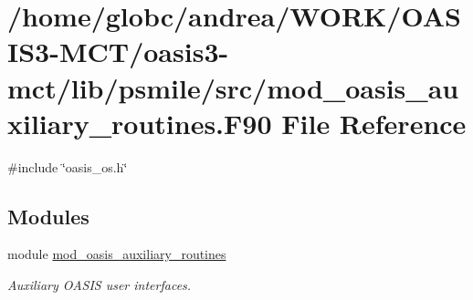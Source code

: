 \hypertarget{mod__oasis__auxiliary__routines_8_f90}{}\section{/home/globc/andrea/\+W\+O\+R\+K/\+O\+A\+S\+I\+S3-\/\+M\+C\+T/oasis3-\/mct/lib/psmile/src/mod\+\_\+oasis\+\_\+auxiliary\+\_\+routines.F90 File Reference}
\label{mod__oasis__auxiliary__routines_8_f90}
{\ttfamily \#include \char`\"{}oasis\+\_\+os.\+h\char`\"{}}\newline
\subsection*{Modules}
\begin{DoxyCompactItemize}
\item 
module \hyperlink{namespacemod__oasis__auxiliary__routines}{mod\+\_\+oasis\+\_\+auxiliary\+\_\+routines}
\begin{DoxyCompactList}\small\item\em Auxiliary O\+A\+S\+IS user interfaces. \end{DoxyCompactList}\end{DoxyCompactItemize}
